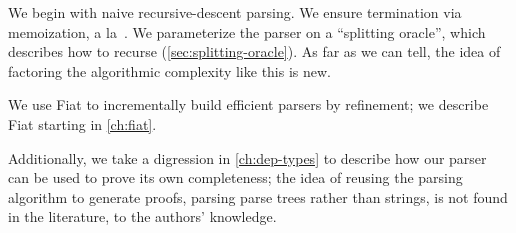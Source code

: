   We begin with naive recursive-descent parsing.    We ensure termination via memoization, a la~\cite{Ridge}.  We parameterize the parser on a ``splitting oracle'', which describes how to recurse (\autoref{sec:splitting-oracle}).  As far as we can tell, the idea of factoring the algorithmic complexity like this is new.
  
  We use Fiat to incrementally build efficient parsers by refinement; we describe Fiat starting in \autoref{ch:fiat}.
  
  Additionally, we take a digression in \autoref{ch:dep-types} to describe how our parser can be used to prove its own completeness; the idea of reusing the parsing algorithm to generate proofs, parsing parse trees rather than strings, is not found in the literature, to the authors' knowledge.
